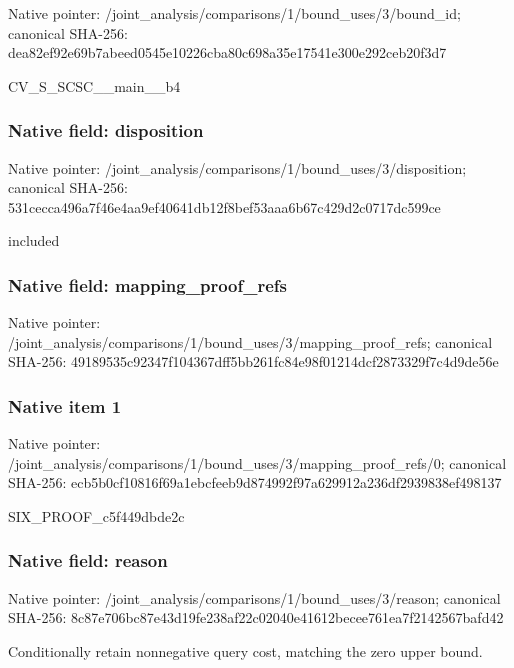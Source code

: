 \documentclass[10pt,a4paper]{article}
\begin{document}
Native pointer: /joint\_analysis/comparis\allowbreak{}ons/1/bound\_uses/3/bound\allowbreak{}\_id; canonical SHA-256: dea82ef92e69b7abeed0545e\allowbreak{}10226cba80c698a35e17541e\allowbreak{}300e292ceb20f3d7


CV\_S\_SCSC\_\_main\_\_b4


\subsubsection{Native field: disposition}


Native pointer: /joint\_analysis/comparis\allowbreak{}ons/1/bound\_uses/3/dispo\allowbreak{}sition; canonical SHA-256: 531cecca496a7f46e4aa9ef4\allowbreak{}0641db12f8bef53aaa6b67c4\allowbreak{}29d2c0717dc599ce


included


\subsubsection{Native field: mapping\_proof\_refs}


Native pointer: /joint\_analysis/comparis\allowbreak{}ons/1/bound\_uses/3/mappi\allowbreak{}ng\_proof\_refs; canonical SHA-256: 49189535c92347f104367dff\allowbreak{}5bb261fc84e98f01214dcf28\allowbreak{}73329f7c4d9de56e



\subsubsection{Native item 1}


Native pointer: /joint\_analysis/comparis\allowbreak{}ons/1/bound\_uses/3/mappi\allowbreak{}ng\_proof\_refs/0; canonical SHA-256: ecb5b0cf10816f69a1ebcfee\allowbreak{}b9d874992f97a629912a236d\allowbreak{}f2939838ef498137


SIX\_PROOF\_c5f449dbde2c


\subsubsection{Native field: reason}


Native pointer: /joint\_analysis/comparis\allowbreak{}ons/1/bound\_uses/3/reaso\allowbreak{}n; canonical SHA-256: 8c87e706bc87e43d19fe238a\allowbreak{}f22c02040e41612becee761e\allowbreak{}a7f2142567bafd42


Conditionally retain nonnegative query cost, matching the zero upper bound.
\end{document}
